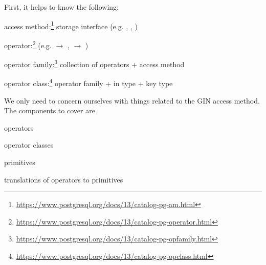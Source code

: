 First, it helps to know the following:

\begin{oparts}
\item
access method:\footnote{%
  \url{https://www.postgresql.org/docs/13/catalog-pg-am.html}%
  } storage interface (e.g. , , )
\item
operator:\footnote{%
  \url{https://www.postgresql.org/docs/13/catalog-pg-operator.html}%
  } (e.g.  $\rightarrow$ ,  $\rightarrow$ )
\item
operator family:\footnote{%
  \url{https://www.postgresql.org/docs/13/catalog-pg-opfamily.html}%
  } collection of operators + access method
\item
operator class:\footnote{%
  \url{https://www.postgresql.org/docs/13/catalog-pg-opclass.html}%
  } operator family + in type + key type
\end{oparts}

We only need to concern ourselves with things related to the GIN access method.
The components to cover are

\begin{nparts}
\item
operators
\item
operator classes
\item
primitives
\item
translations of operators to primitives
\end{nparts}
